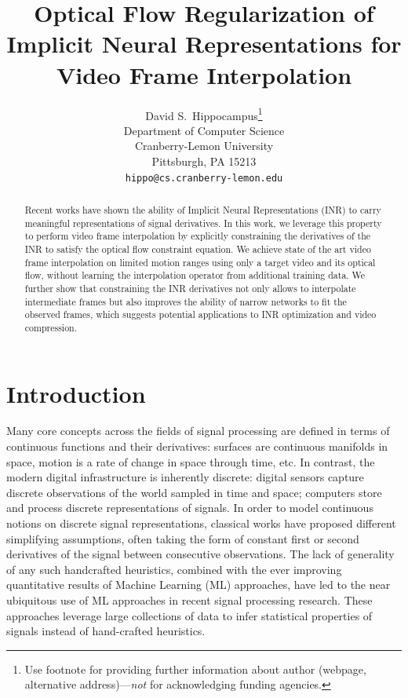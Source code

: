 \documentclass{article}
\title{Optical Flow Regularization of Implicit Neural Representations for Video Frame Interpolation}
\author{%
  David S.~Hippocampus\thanks{Use footnote for providing further information
    about author (webpage, alternative address)---\emph{not} for acknowledging
    funding agencies.} \\
  Department of Computer Science\\
  Cranberry-Lemon University\\
  Pittsburgh, PA 15213 \\
  \texttt{hippo@cs.cranberry-lemon.edu} \\
}
\begin{document}
\maketitle


\begin{abstract}
Recent works have shown the ability of Implicit Neural Representations (INR) to carry meaningful representations of signal derivatives.
In this work, we leverage this property to perform video frame interpolation
by explicitly constraining the derivatives of the INR to satisfy the optical flow constraint equation.
We achieve state of the art video frame interpolation on limited motion ranges
using only a target video and its optical flow, without learning the interpolation operator from additional training data.
We further show that constraining the INR derivatives not only
allows to interpolate intermediate frames but also improves the ability of narrow networks to fit the observed frames,
which suggests potential applications to INR optimization and video compression.
\end{abstract}

\section{Introduction}


Many core concepts across the fields of signal processing are defined in terms of continuous functions and their derivatives:
surfaces are continuous manifolds in space,
motion is a rate of change in space through time, etc.
In contrast, the modern digital infrastructure is inherently discrete:
digital sensors capture discrete observations of the world sampled in time and space;
computers store and process discrete representations of signals.
In order to model continuous notions on discrete signal representations,
classical works have proposed different simplifying assumptions,
often taking the form of constant first or second derivatives of the signal between consecutive observations.
The lack of generality of any such handcrafted heuristics,
combined with the ever improving quantitative results of Machine Learning (ML) approaches,
have led to the near ubiquitous use of ML approaches in recent signal processing research.
These approaches leverage large collections of data to infer statistical properties of signals instead of hand-crafted heuristics.
\end{document}
